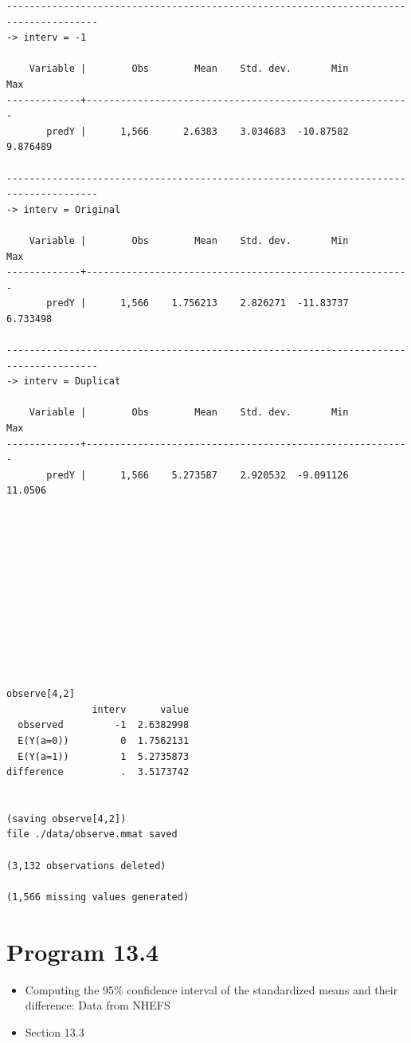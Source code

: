 \documentclass[
  10pt,
  a4paper,
]{book}
\providecommand{\tightlist}{%
  \setlength{\itemsep}{0pt}\setlength{\parskip}{0pt}}
\begin{document}
\begin{verbatim}
--------------------------------------------------------------------------------------
-> interv = -1

    Variable |        Obs        Mean    Std. dev.       Min        Max
-------------+---------------------------------------------------------
       predY |      1,566      2.6383    3.034683  -10.87582   9.876489

--------------------------------------------------------------------------------------
-> interv = Original

    Variable |        Obs        Mean    Std. dev.       Min        Max
-------------+---------------------------------------------------------
       predY |      1,566    1.756213    2.826271  -11.83737   6.733498

--------------------------------------------------------------------------------------
-> interv = Duplicat

    Variable |        Obs        Mean    Std. dev.       Min        Max
-------------+---------------------------------------------------------
       predY |      1,566    5.273587    2.920532  -9.091126    11.0506












observe[4,2]
               interv      value
  observed         -1  2.6382998
  E(Y(a=0))         0  1.7562131
  E(Y(a=1))         1  5.2735873
difference          .  3.5173742


(saving observe[4,2])
file ./data/observe.mmat saved

(3,132 observations deleted)

(1,566 missing values generated)
\end{verbatim}

\section{Program 13.4}\label{program-13.4-1}

\begin{itemize}
\tightlist
\item
  Computing the 95\% confidence interval of the standardized means and their difference: Data from NHEFS
\item
  Section 13.3
\end{itemize}
\end{document}
